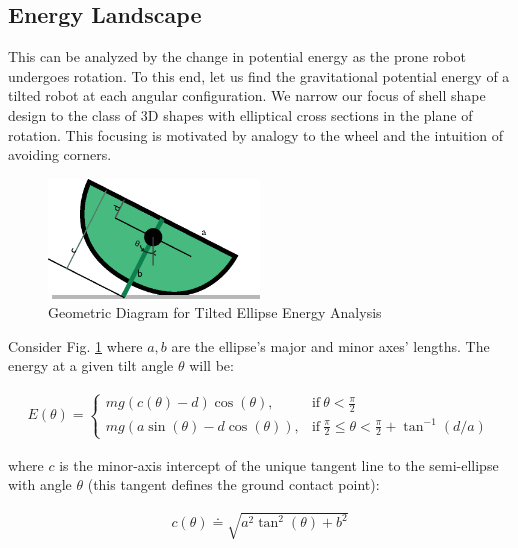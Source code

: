 \documentclass[letterpaper]{report}
\begin{document}
\subsection{Energy Landscape}
This can be analyzed by the change in potential energy as the prone robot undergoes rotation.
To this end, let us find the gravitational potential energy of a tilted robot at each angular configuration.
We narrow our focus of shell shape design to the class of 3D shapes with elliptical cross sections in the plane of rotation.
This focusing is motivated by analogy to the wheel and the intuition of avoiding corners.

\begin{figure}[ht]
\centering
\includegraphics[width=0.5\textwidth]{QS_EnergyAnalysis.eps}
\caption{\label{f:QS_energyGeometry}Geometric Diagram for Tilted Ellipse Energy Analysis}
\end{figure}

Consider Fig. \ref{f:QS_energyGeometry} where $a,b$ are the ellipse's major and minor axes' lengths.
The energy at a given tilt angle $\theta$ will be:

\begin{align}
  E(\theta) =
    \begin{cases}
      mg (c(\theta)-d) \cos(\theta), & \text{if}\ \theta < \frac{\pi}{2} \\
      mg (a \sin(\theta) - d \cos(\theta) ), & \text{if}\ \frac{\pi}{2} \leq \theta < \frac{\pi}{2} + \tan^{-1}(d/a)
    \end{cases}
  \label{eq:QSEnergy}
\end{align}

where $c$ is the minor-axis intercept of the unique tangent line to the semi-ellipse with angle $\theta$ (this tangent defines the ground contact point):

\begin{align}
  c(\theta) \doteq \sqrt{a^2 \tan^2(\theta) + b^2}
\end{align}
\end{document}

